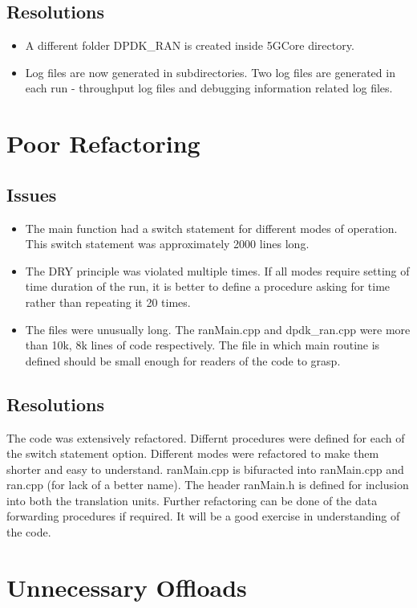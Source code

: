 \subsection{Resolutions}
\begin{itemize}
	\item A different folder DPDK\_RAN is created inside 5GCore directory.
	\item Log files are now generated in subdirectories. Two log files are generated in each run - throughput 
	log files and debugging information related log files.
\end{itemize}
\section{Poor Refactoring}

\subsection{Issues}
\begin{itemize}
	\item The main function had a switch statement for different modes of operation. This switch statement was approximately 2000 lines long.
	\item The DRY principle was violated multiple times. If all modes require setting of time duration of the run, it is better to
	define a procedure asking for time rather than repeating it 20 times.
	\item The files were unusually long. The ranMain.cpp and dpdk\_ran.cpp were more than 10k,  8k lines of code respectively.
	The file in which main routine is defined should be small enough for readers of the code to grasp.
\end{itemize}	
\subsection{Resolutions}
The code was extensively refactored. Differnt procedures were defined for each of the switch statement option.
Different modes were refactored to make them shorter and easy to understand. 
ranMain.cpp is bifuracted into ranMain.cpp and ran.cpp (for lack of a better name). The header ranMain.h is defined for
inclusion into both the translation units.
Further refactoring can be done of the data forwarding procedures if required. It will be a good exercise in 
understanding of the code.

\section{Unnecessary Offloads}
